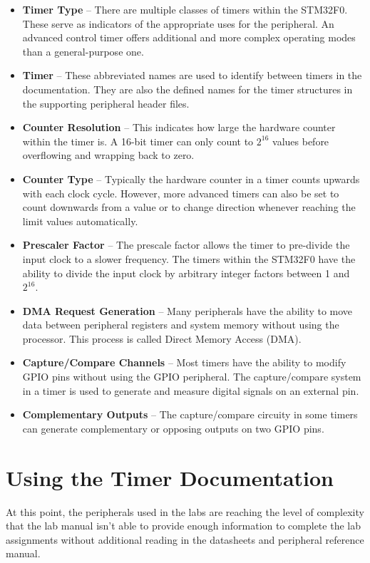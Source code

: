 \documentclass[11pt,fleqn]{book} %
\begin{document}
        \begin{itemize}
            \item \textbf{Timer Type} -- There are multiple classes of timers within the STM32F0. These serve as indicators of the appropriate uses for the peripheral. An advanced control timer offers additional and more complex operating modes than a general-purpose one. 
            \item \textbf{Timer} -- These abbreviated names are used to identify between timers in the documentation. They are also the defined names for the timer structures in the supporting peripheral header files. 
            \item \textbf{Counter Resolution} -- This indicates how large the hardware counter within the timer is. A 16-bit timer can only count to $2^{16}$ values before overflowing and wrapping back to zero. 
            \item \textbf{Counter Type} -- Typically the hardware counter in a timer counts upwards with each clock cycle. However, more advanced timers can also be set to count downwards from a value or to change direction whenever reaching the limit values automatically. 
            \item \textbf{Prescaler Factor} -- The prescale factor allows the timer to pre-divide the input clock to a slower frequency. The timers within the STM32F0 have the ability to divide the input clock by arbitrary integer factors between 1 and $2^{16}$.
            \item \textbf{DMA Request Generation} -- Many peripherals have the ability to move data between peripheral registers and system memory without using the processor. This process is called Direct Memory Access (DMA).
            \item \textbf{Capture/Compare Channels} -- Most timers have the ability to modify GPIO pins without using the GPIO peripheral. The capture/compare system in a timer is used to generate and measure digital signals on an external pin. 
            \item \textbf{Complementary Outputs} -- The capture/compare circuity in some timers can generate complementary or opposing outputs on two GPIO pins. 
        \end{itemize}

\section{Using the Timer Documentation}
    At this point, the peripherals used in the labs are reaching the level of complexity that the lab manual isn't able to provide enough information to complete the lab assignments without additional reading in the datasheets and peripheral reference manual. 
    
\end{document}
